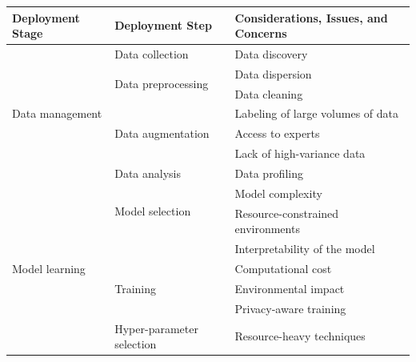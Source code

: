 

\begin{table}[H]
\begin{tabular}{|l|l|l|}
\hline
                  \textbf{Deployment Stage}&\textbf{Deployment Step}& \textbf{Considerations, Issues, and Concerns} \\ \hline
\multirow{7}{*}{Data management} &                   Data collection&  Data discovery\\ \cline{2-3} 
                  & \multirow{2}{*}{Data preprocessing} &  Data dispersion\\  
                  &                                     &  Data cleaning\\ \cline{2-3} 
                  & \multirow{3}{*}{Data augmentation}  &  Labeling of large volumes of data\\ 
                  &                                     &  Access to experts\\ 
                  &                                     &  Lack of high-variance data\\ \cline{2-3} 
                  &                   Data analysis     &  Data profiling\\ \hline
\multirow{9}{*}{Model learning} & \multirow{2}{*}{Model selection}   &  Model complexity\\ 
                  &                                     &  Resource-constrained environments\\ 
                  &                                     &  Interpretability of the model\\ \cline{2-3} 
                  & \multirow{3}{*}{Training}           &  Computational cost\\ 
                  &                                     &  Environmental impact\\ 
                  &                                     &  Privacy-aware training\\ \cline{2-3} 
                  & \multirow{3}{*}{Hyper-parameter selection} &  Resource-heavy techniques\\ 

\end{tabular}
\end{table}
